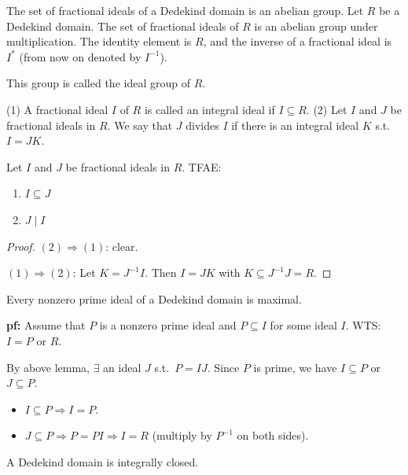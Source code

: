 \documentclass[11pt, a4paper]{report}
\begin{document}
\begin{proposition}
The set of fractional ideals of a Dedekind domain is an abelian group. Let $R$ be a Dedekind domain. The set of fractional ideals of $R$ is an abelian group under multiplication. The identity element is $R$, and the inverse of a fractional ideal is $I^{*}$ (from now on denoted by $I^{-1}$).

This group is called the ideal group of $R$.
\end{proposition}

\begin{definition}
(1) A fractional ideal $I$ of $R$ is called an integral ideal if $I \subseteq R$.
(2) Let $I$ and $J$ be fractional ideals in $R$. We say that $J$ divides $I$ if there is an integral ideal $K$ s.t.\ $I = JK$.
\end{definition}

\begin{lemma}
Let $I$ and $J$ be fractional ideals in $R$. TFAE:
\begin{enumerate}
    \item $I \subseteq J$
    \item $J \mid I$
\end{enumerate}
\end{lemma}

\begin{proof}
$(2) \Rightarrow (1)$: clear.

$(1) \Rightarrow (2)$: Let $K = J^{-1}I$. Then $I = JK$ with $K \subseteq J^{-1}J = R$.
\end{proof}

\begin{corollary}
Every nonzero prime ideal of a Dedekind domain is maximal.

\textbf{pf:} Assume that $P$ is a nonzero prime ideal and $P \subseteq I$ for some ideal $I$. WTS: $I = P$ or $R$.

By above lemma, $\exists$ an ideal $J$ s.t.\ $P = IJ$.
Since $P$ is prime, we have $I \subseteq P$ or $J \subseteq P$.
\begin{itemize}
    \item $I \subseteq P \Rightarrow I = P$.
    \item $J \subseteq P \Rightarrow P = PI \Rightarrow I = R$ (multiply by $P^{-1}$ on both sides).
\end{itemize}
\end{corollary}

\begin{corollary}
A Dedekind domain is integrally closed.
\end{corollary}
\end{document}
